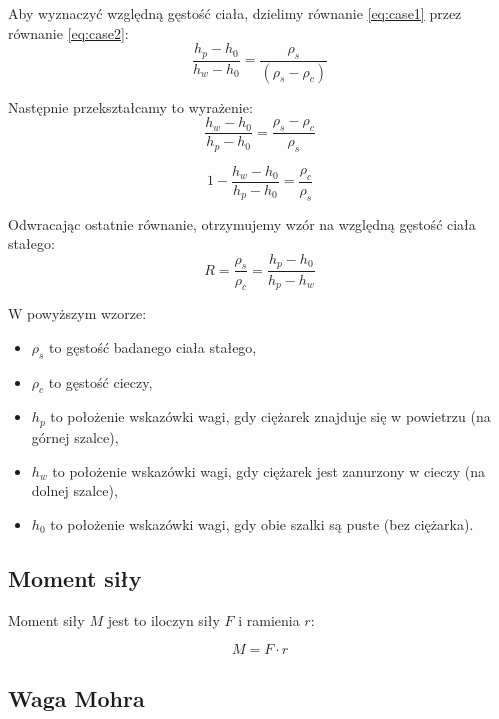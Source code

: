 \documentclass[a4paper,12pt]{article}
\begin{document}
Aby wyznaczyć względną gęstość ciała, dzielimy równanie \eqref{eq:case1} przez równanie \eqref{eq:case2}:
\begin{equation*}
    \frac{h_p - h_0}{h_w - h_0} = \frac{\rho_{s}}{(\rho_{s} - \rho_{c})}
\end{equation*}

Następnie przekształcamy to wyrażenie:
\begin{equation*}
    \frac{h_w - h_0}{h_p - h_0} = \frac{\rho_{s} - \rho_{c}}{\rho_{s}}
\end{equation*}

\begin{equation*}
    1 - \frac{h_w - h_0}{h_p - h_0} = \frac{\rho_{c}}{\rho_{s}}
\end{equation*}

Odwracając ostatnie równanie, otrzymujemy wzór na względną gęstość ciała stałego:
\begin{equation}
    \label{eq:wzgledna_gestosc_jolly}
    R = \frac{\rho_{s}}{\rho_c} = \frac{h_p - h_0}{h_p - h_w}
\end{equation}

W powyższym wzorze:
\begin{itemize}
    \item $\rho_{s}$ to gęstość badanego ciała stałego,
    \item $\rho_c$ to gęstość cieczy,
    \item $h_p$ to położenie wskazówki wagi, gdy ciężarek znajduje się w powietrzu (na górnej szalce),
    \item $h_w$ to położenie wskazówki wagi, gdy ciężarek jest zanurzony w cieczy (na dolnej szalce),
    \item $h_0$ to położenie wskazówki wagi, gdy obie szalki są puste (bez ciężarka).
\end{itemize}

\subsection*{Moment siły}

Moment siły $M$ jest to iloczyn siły $F$ i ramienia $r$:

\begin{equation*}
    M = F \cdot r
\end{equation*}

\subsection*{Waga Mohra}
\end{document}
